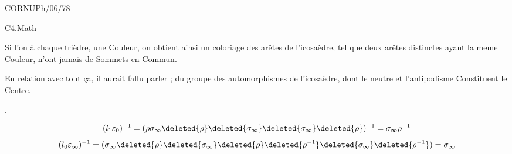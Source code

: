 
CORNU\qquad Ph/06/78

C4.Math


Si l'on  à chaque trièdre, une Couleur, on obtient ainsi un coloriage des arêtes de l'icosaèdre, tel que deux arêtes distinctes ayant la meme Couleur,  n'ont jamais de Sommets en Commun.

En relation avec tout ça, il aurait fallu parler ; du groupe des automorphismes de l'icosaèdre, dont le neutre et l'antipodisme Constituent le Centre.


\begin{center}
\uline{}.
\end{center}



\[
(l_1\varepsilon_0)^{-1}
=(\rho\sigma_\infty\deleted{\rho}\deleted{\sigma_\infty}
\deleted{\sigma_\infty}\deleted{\rho})^{-1}
=\sigma_\infty\rho^{-1}
\]
\[
(l_0\varepsilon_\infty)^{-1}
=(\sigma_\infty\deleted{\rho}\deleted{\sigma_\infty}
\deleted{\rho}\deleted{\rho^{-1}}\deleted{\sigma_\infty}
\deleted{\rho^{-1}})=\sigma_\infty
\]


